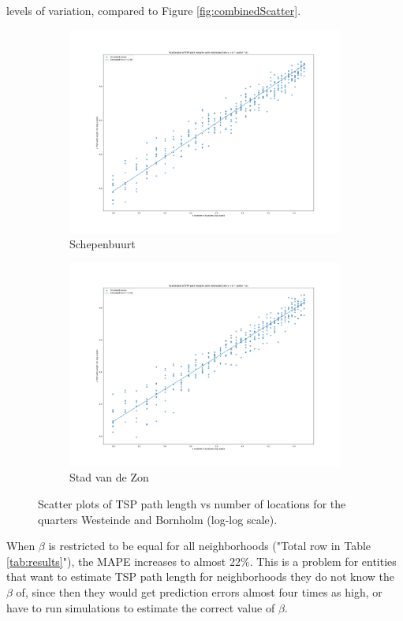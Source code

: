 levels of variation, compared to Figure \ref{fig:combinedScatter}.
\begin{figure}[H]
	\centering
	\begin{subfigure}[b]{0.49\textwidth}
		\includegraphics[width=\textwidth]{../project/plots/scatter_friesland-Westeinde.png}
		\caption{Schepenbuurt}
		\label{fig:WesteindeScatter}
	\end{subfigure}
	\hfill
	\begin{subfigure}[b]{0.49\textwidth}
		\includegraphics[width=\textwidth]{../project/plots/scatter_noord_holland-Bornholm.png}
		\caption{Stad van de Zon}
		\label{fig:BornholmScatter}
	\end{subfigure}
	\caption{Scatter plots of TSP path length vs number of locations for the quarters Westeinde and Bornholm (log-log scale).}
	\label{fig:combinedScatter2}
\end{figure}
When $\beta$ is restricted to be equal for all neighborhoods ("Total row in Table \ref{tab:results}"), the MAPE increases to almost 22\%.
This is a problem for entities that want to estimate TSP path length for neighborhoods they do not know the $\beta$ of, since then they would get prediction 
errors almost four times as high, or have to run simulations to estimate the correct value of $\beta$.
